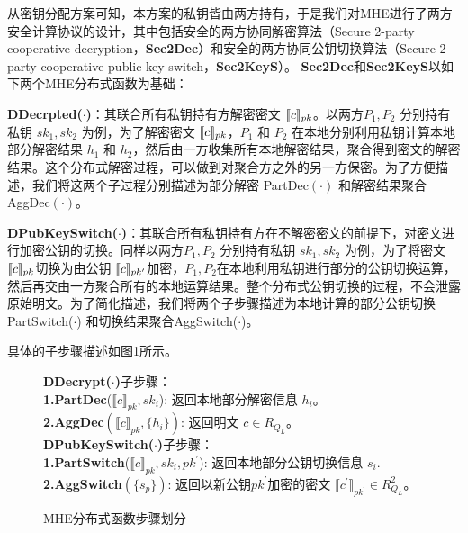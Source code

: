从密钥分配方案可知，本方案的私钥皆由两方持有，于是我们对MHE进行了两方安全计算协议的设计，其中包括安全的两方协同解密算法（Secure 2-party cooperative decryption，\textbf{Sec2Dec}）和安全的两方协同公钥切换算法（Secure 2-party cooperative public key switch，\textbf{Sec2KeyS}）。
\textbf{Sec2Dec}和\textbf{Sec2KeyS}以如下两个MHE分布式函数为基础：
\begin{compactitem}
	\item \textbf{DDecrpted($\cdot$)}：其联合所有私钥持有方解密密文 $\ctx[pk]{c}$。以两方$P_1, P_2$ 分别持有私钥 $sk_1, sk_2$ 为例，为了解密密文 $\ctx[pk]{c}$，$P_1$ 和 $P_2$ 在本地分别利用私钥计算本地部分解密结果 $ h_1 $ 和 $ h_2 $，然后由一方收集所有本地解密结果，聚合得到密文的解密结果。这个分布式解密过程，可以做到对聚合方之外的另一方保密。为了方便描述，我们将这两个子过程分别描述为部分解密 PartDec$(\cdot)$ 和解密结果聚合 AggDec$(\cdot)$。
	\item  \textbf{DPubKeySwitch($ \cdot $)}：其联合所有私钥持有方在不解密密文的前提下，对密文进行加密公钥的切换。同样以两方$P_1, P_2$ 分别持有私钥 $sk_1, sk_2$ 为例，为了将密文$ \ctx[pk]{c} $切换为由公钥 $ \ctx[pk^{\prime}]{c} $加密，$ P_1,P_2 $在本地利用私钥进行部分的公钥切换运算，然后再交由一方聚合所有的本地运算结果。整个分布式公钥切换的过程，不会泄露原始明文。为了简化描述，我们将两个子步骤描述为本地计算的部分公钥切换PartSwitch($\cdot$) 和切换结果聚合AggSwitch($\cdot$)。
\end{compactitem}
具体的子步骤描述如图\ref{f2}所示。
\begin{figure}
	\begin{framed}
		\textbf{DDecrypt($\cdot$)}子步骤：\\
		\indent\textbf{1.PartDec}($\llbracket c\rrbracket_{pk},sk_i$): 返回本地部分解密信息 $h_i$。\\
		\indent\textbf{2.AggDec}$(\llbracket c\rrbracket_{pk},\{h_i\})$: 返回明文 $c\in R_{Q_{L}}$。\\
		
		\textbf{DPubKeySwitch($ \cdot $)}子步骤：\\
		\indent\textbf{1.PartSwitch}($\llbracket c\rrbracket_{pk},{sk_i},pk^{\prime}$): 返回本地部分公钥切换信息 $s_i$.\\
		\indent\textbf{2.AggSwitch}$(\{s_p\})$: 返回以新公钥$ pk^{\prime} $加密的密文 $\llbracket c^{\prime}\rrbracket_{pk^{\prime}} \in R^2_{Q_{L}}$。
	\end{framed}
	\caption{MHE分布式函数步骤划分}
	\label{f2}
\end{figure}

